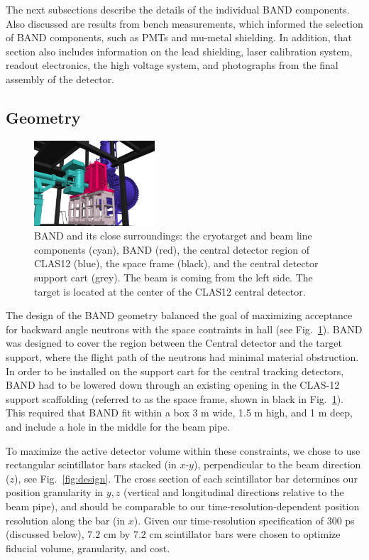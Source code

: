 \documentclass[3p,twocolumn]{elsarticle}
\begin{document}
The next subsections describe the details of the individual BAND components.
Also discussed are results from bench measurements, which informed the selection of
BAND components, such as PMTs and mu-metal shielding. In addition,
that section also includes information on the lead shielding, laser
calibration system, readout electronics, the high voltage system, and
 photographs from the final assembly of the detector.


\subsection{Geometry}
\begin{figure}[tb]
	\centering
		\includegraphics[width=0.40\textwidth]{FULL_CONTEXT_STUDIE_3.jpg}
		\vspace{0.5cm}
	    \caption{BAND and its close surroundings: the
                  cryotarget and beam line components (cyan),  BAND
                  (red), the central detector region of CLAS12
                  (blue), the space frame (black), and the central detector support cart (grey). The beam is coming from the left side. The
                  target is located at the center of the CLAS12 central detector.}
		\label{fig:bandtarget}
		
\end{figure}

The design of the BAND geometry balanced the goal of maximizing acceptance for backward angle neutrons
with the space contraints in hall (see Fig.~\ref{fig:bandtarget}). BAND was designed to cover the region
between the Central detector and the target support, where the flight path of the neutrons had minimal
material obstruction. In order to be installed on the support cart for the central tracking detectors, BAND
had to be lowered down through an existing opening in the CLAS-12 support scaffolding (referred to as the space
frame, shown in black in Fig.~\ref{fig:bandtarget}). This required that BAND fit within a box 3 \si{\meter} wide, 1.5 \si{\meter} high, and 1 \si{\meter} deep, and include a hole in the middle for the beam pipe. 


To maximize the active detector volume within these constraints, we
chose to use rectangular scintillator bars stacked (in $x$-$y$), perpendicular to
the beam direction ($z$), see Fig.~\ref{fig:design}.  The cross
section of each scintillator bar determines our position granularity
in $y,z$ (vertical and longitudinal directions relative to the beam
pipe), and should be comparable to our time-resolution-dependent position
resolution along the bar (in $x$). Given our time-resolution specification of
$300$ \si{\pico\second} (discussed below), $7.2$
\si{\centi\meter} by $7.2$ \si{\centi\meter} scintillator bars were
chosen to optimize fiducial volume, granularity, and cost.
\end{document}
